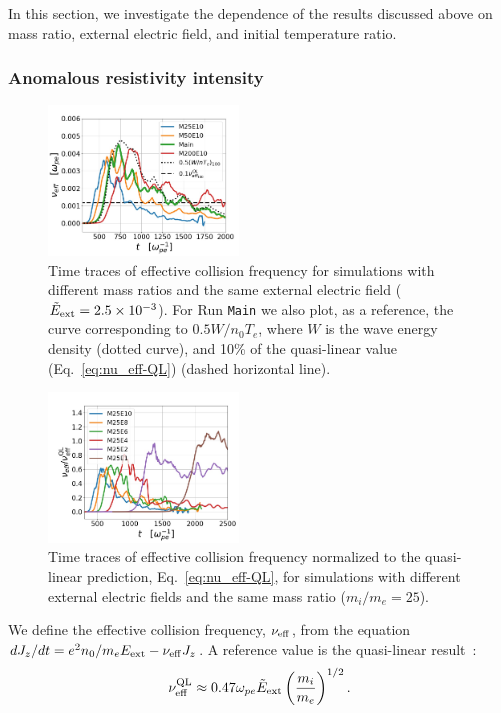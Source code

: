 \documentclass[%
 reprint,
 amsmath,
 amssymb,
 aps,
 prx,
floatfix,
superscriptaddress
]{revtex4-2}
\begin{document}
In this section, we investigate the dependence of the results discussed above on mass ratio, external electric field, and initial temperature ratio.

\subsubsection{\label{sec:resistivity_strength} Anomalous resistivity intensity}

\begin{figure}[!htp]
\includegraphics[width=0.45\textwidth]{Fig7.jpeg}%
\caption{\label{fig:7.nu_eff} Time traces of effective collision frequency for simulations with different mass ratios and the same external electric field ($\tilde{E}_{\rm{ext}} = 2.5\times 10^{-3}$). 
For Run {\tt Main} we also plot, as a reference, the curve corresponding to $0.5 W/n_0T_e$, where $W$ is the wave energy density (dotted curve), and 10\% of the quasi-linear value (Eq.~\eqref{eq:nu_eff-QL}) (dashed horizontal line).}
\end{figure}

\begin{figure}[!htp]
\includegraphics[width=0.45\textwidth]{Fig8.jpeg}%
\caption{\label{fig:8.nu_eff_E} Time traces of effective collision frequency normalized to the quasi-linear prediction, Eq.~\eqref{eq:nu_eff-QL}, for simulations with different external electric fields and the same mass ratio ($m_i/m_e = 25$).} 
\end{figure}

We define the effective collision frequency, $\nu_{\rm{eff}}$, from the equation $ dJ_z/dt = e^2n_0/m_e E_{\rm{ext}} - \nu_{\rm{eff}}J_z$.
A reference value is the quasi-linear result~\cite{bychenkov1988ion}:
\begin{align}
\label{eq:nu_eff-QL}
\nu_{\rm{eff}}^{\rm{QL}} \approx 0.47 \omega_{pe}\tilde{E}_{\rm{ext}}\left(\frac{m_i}{m_e}\right)^{1/2} .
\end{align}
\end{document}
